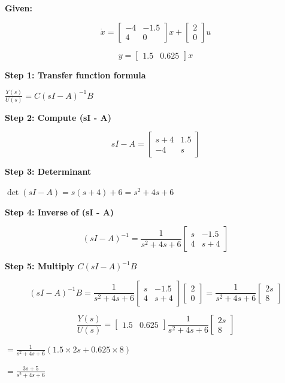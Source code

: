 \documentclass[11pt,a4paper]{article}
\begin{document}
\begin{tcolorbox}[solbox, title=Detailed Solution -- Question 2]
\textbf{Given:}

\[
\dot{x} = \begin{bmatrix} -4 & -1.5 \\ 4 & 0 \end{bmatrix} x + \begin{bmatrix} 2 \\ 0 \end{bmatrix} u
\]

\[
y = \begin{bmatrix} 1.5 & 0.625 \end{bmatrix} x
\]

\textbf{Step 1: Transfer function formula}

$\frac{Y(s)}{U(s)} = C(sI - A)^{-1}B$

\textbf{Step 2: Compute (sI - A)}

\[
sI - A = \begin{bmatrix} s+4 & 1.5 \\ -4 & s \end{bmatrix}
\]

\textbf{Step 3: Determinant}

$\det(sI-A) = s(s+4) + 6 = s^2 + 4s + 6$

\textbf{Step 4: Inverse of (sI - A)}

\[
(sI-A)^{-1} = \frac{1}{s^2+4s+6}\begin{bmatrix} s & -1.5 \\ 4 & s+4 \end{bmatrix}
\]

\textbf{Step 5: Multiply $C(sI-A)^{-1} B$}

\[
(sI-A)^{-1}B = \frac{1}{s^2+4s+6}\begin{bmatrix} s & -1.5 \\ 4 & s+4 \end{bmatrix}\begin{bmatrix}2\\0\end{bmatrix} = \frac{1}{s^2+4s+6}\begin{bmatrix}2s\\8\end{bmatrix}
\]

\[
\frac{Y(s)}{U(s)} = \begin{bmatrix}1.5 & 0.625\end{bmatrix}\frac{1}{s^2+4s+6}\begin{bmatrix}2s\\8\end{bmatrix}
\]

$= \frac{1}{s^2+4s+6}\left(1.5 \times 2s + 0.625 \times 8\right)$

$= \frac{3s + 5}{s^2 + 4s + 6}$
\end{tcolorbox}
\end{document}
